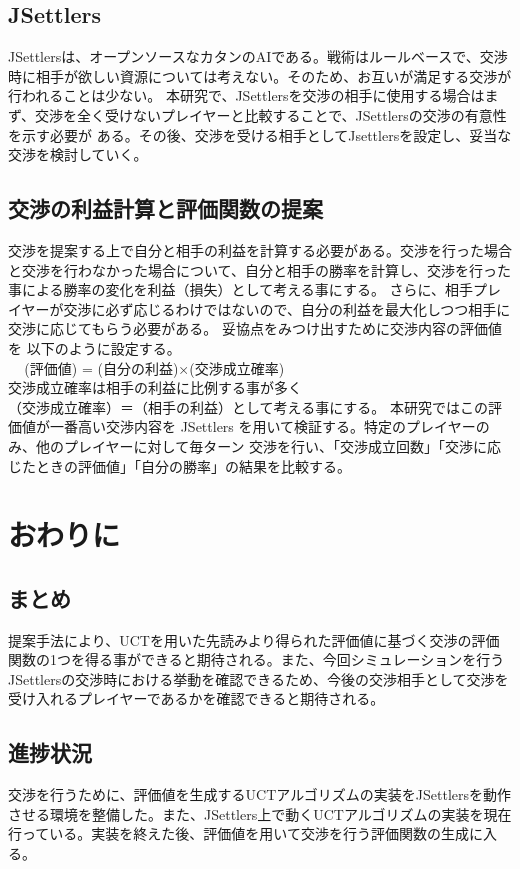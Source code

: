 \documentclass[a4, 10pt,dvipdfmx,twocolumn]{jsarticle}
\begin{document}
\subsection{JSettlers}
JSettlersは、オープンソースなカタンのAIである。戦術はルールベースで、交渉時に相手が欲しい資源については考えない。そのため、お互いが満足する交渉が行われることは少ない。
本研究で、JSettlersを交渉の相手に使用する場合はまず、交渉を全く受けないプレイヤーと比較することで、JSettlersの交渉の有意性を示す必要が ある。その後、交渉を受ける相手としてJsettlersを設定し、妥当な交渉を検討していく。
\subsection{交渉の利益計算と評価関数の提案}
交渉を提案する上で自分と相手の利益を計算する必要がある。交渉を行った場合と交渉を行わなかった場合について、自分と相手の勝率を計算し、交渉を行った事による勝率の変化を利益（損失）として考える事にする。
さらに、相手プレイヤーが交渉に必ず応じるわけではないので、自分の利益を最大化しつつ相手に交渉に応じてもらう必要がある。
妥協点をみつけ出すために交渉内容の評価値を 以下のように設定する。
\\ \,\,\,\,\,\,\,(評価値) = (自分の利益)×(交渉成立確率)\\
交渉成立確率は相手の利益に比例する事が多く\\（交渉成立確率）＝（相手の利益）として考える事にする。
本研究ではこの評価値が一番高い交渉内容を JSettlers を用いて検証する。特定のプレイヤーのみ、他のプレイヤーに対して毎ターン
交渉を行い、「交渉成立回数」「交渉に応じたときの評価値」「自分の勝率」の結果を比較する。
\section{おわりに}
\subsection{まとめ}
提案手法により、UCTを用いた先読みより得られた評価値に基づく交渉の評価関数の1つを得る事ができると期待される。また、今回シミュレーションを行うJSettlersの交渉時における挙動を確認できるため、今後の交渉相手として交渉を受け入れるプレイヤーであるかを確認できると期待される。
\subsection{進捗状況}
交渉を行うために、評価値を生成するUCTアルゴリズムの実装をJSettlersを動作させる環境を整備した。また、JSettlers上で動くUCTアルゴリズムの実装を現在行っている。実装を終えた後、評価値を用いて交渉を行う評価関数の生成に入る。
\end{document}

